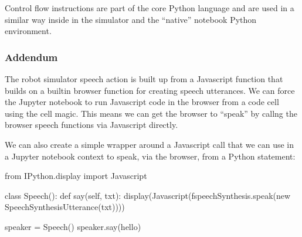 \documentclass[letterpaper,10pt,english]{sphinxmanual}
\begin{document}
Control flow instructions are part of the core Python language and are used in a similar way inside in the simulator and the “native” notebook Python environment.


\subsubsection{Addendum}
\label{\detokenize{content/02_Robot_Lab/Section_00_01:Addendum}}
The robot simulator speech action is built up from a Javascript function that builds on a built\sphinxhyphen{}in browser function for creating speech utterances. We can force the Jupyter notebook to run Javascript code in the browser from a code cell using the  cell magic. This means we can get the browser to “speak” by callng the browser speech functions via Javascript directly.


{
\begin{sphinxVerbatim}[commandchars=\\\{\}]
\llap{\color{nbsphinxin}[ ]:\,\hspace{\fboxrule}\hspace{\fboxsep}}
 
\end{sphinxVerbatim}
}

We can also create a simple wrapper around a Javascript call that we can use in a Jupyter notebook context to speak, via the browser, from a Python statement:

{
\begin{sphinxVerbatim}[commandchars=\\\{\}]
\llap{\color{nbsphinxin}[ ]:\,\hspace{\fboxrule}\hspace{\fboxsep}}from IPython.display import Javascript

class Speech():
    def say(self, txt):
        display(Javascript(f\PYGZsq{}speechSynthesis.speak(new SpeechSynthesisUtterance(\PYGZdq{}\PYGZob{}txt\PYGZcb{}\PYGZdq{}))\PYGZsq{}))

speaker = Speech()
speaker.say(\PYGZsq{}hello\PYGZsq{})
\end{sphinxVerbatim}
}
\end{document}
